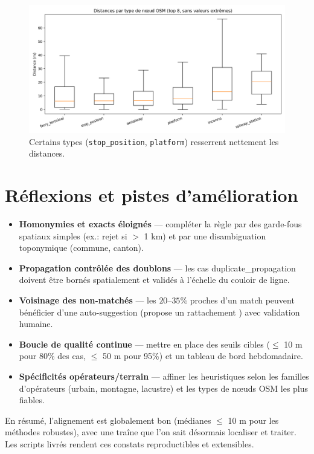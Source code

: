 \begin{figure}[h]
    \centering
    \includegraphics[width=\textwidth]{../figures/chap5/distances_by_osm_node_type_box.png}
    \caption[Par type de nœud OSM]{Certains types (\texttt{stop\_position}, \texttt{platform}) resserrent nettement les distances.}
\end{figure}

\section{Réflexions et pistes d'amélioration}

\begin{itemize}
    \item \textbf{Homonymies et \og exacts \fg{} éloignés} — compléter la règle par des garde-fous spatiaux simples (ex.: rejet si \(>\) 1 km) et par une disambiguation toponymique (commune, canton).
    \item \textbf{Propagation contrôlée des doublons} — les cas \og duplicate\_propagation \fg{} doivent être bornés spatialement et validés à l'échelle du couloir de ligne.
    \item \textbf{Voisinage des non-matchés} — les \(20\)–\(35\%\) proches d'un match peuvent bénéficier d'une auto-suggestion (\og propose un rattachement \fg{}) avec validation humaine.
    \item \textbf{Boucle de qualité continue} — mettre en place des seuils cibles (\(\leq\) 10 m pour 80\% des cas, \(\leq\) 50 m pour 95\%) et un tableau de bord hebdomadaire.
    \item \textbf{Spécificités opérateurs/terrain} — affiner les heuristiques selon les familles d'opérateurs (urbain, montagne, lacustre) et les types de nœuds OSM les plus fiables.
\end{itemize}

En résumé, l'alignement est globalement bon (médianes \(\leq\) 10 m pour les méthodes robustes), avec une traîne que l'on sait désormais 
localiser et traiter. Les scripts livrés rendent ces constats reproductibles et extensibles.


